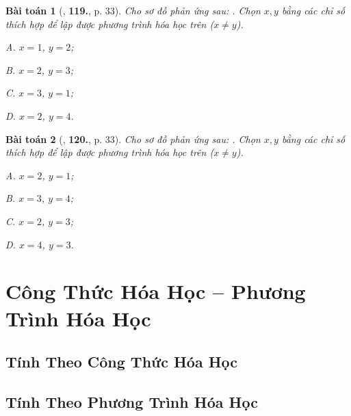 \documentclass{article}
\numberwithin{equation}{section}
\newtheorem{baitoan}{Bài toán}[section]
\begin{document}
\begin{baitoan}[\cite{An2011}, \textbf{119.}, p. 33]
	Cho sơ đồ phản ứng sau: \emph{}. Chọn $x,y$ bằng các chỉ số thích hợp để lập được phương trình hóa học trên ($x\ne y$).
	\begin{enumerate*}
		\item[{\rm\sf A.}] $x = 1$, $y = 2$;
		\item[{\rm\sf B.}] $x = 2$, $y = 3$;
		\item[{\rm\sf C.}] $x = 3$, $y = 1$;
		\item[{\rm\sf D.}] $x = 2$, $y = 4$.
	\end{enumerate*}
\end{baitoan}

\begin{baitoan}[\cite{An2011}, \textbf{120.}, p. 33]
	Cho sơ đồ phản ứng sau: \emph{}. Chọn $x,y$ bằng các chỉ số thích hợp để lập được phương trình hóa học trên ($x\ne y$).
	\begin{enumerate*}
		\item[{\rm\sf A.}] $x = 2$, $y = 1$;
		\item[{\rm\sf B.}] $x = 3$, $y = 4$;
		\item[{\rm\sf C.}] $x = 2$, $y = 3$;
		\item[{\rm\sf D.}] $x = 4$, $y = 3$.
	\end{enumerate*}
\end{baitoan}


\section{Công Thức Hóa Học -- Phương Trình Hóa Học}

\subsection{Tính Theo Công Thức Hóa Học}


\subsection{Tính Theo Phương Trình Hóa Học}

\end{document}
